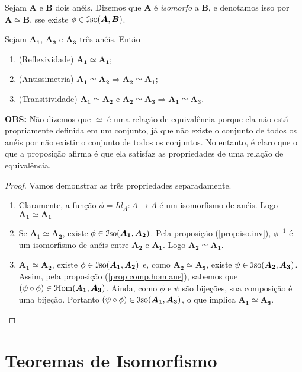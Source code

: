 \begin{defi}
	Sejam $\bm A$ e $\bm B$ dois anéis. Dizemos que $\bm A$ é \emph{isomorfo} a $\bm B$, e denotamos isso por $\bm A \simeq \bm B$, sse existe $\phi \in \mathcal{I}\mathrm{so}(\bm A,\bm B)$.
\end{defi}	

\begin{prop}
	Sejam $\bm{A_1}$, $\bm{A_2}$ e $\bm{A_3}$ três anéis. Então
	\begin{enumerate}
	\item (Reflexividade) $\bm{A_1} \simeq \bm{A_1}$;
	\item (Antissimetria) $\bm{A_1} \simeq \bm{A_2} \Rightarrow \bm{A_2} \simeq \bm{A_1}$;
	\item (Transitividade) $\bm{A_1} \simeq \bm{A_2} \text{\ e\ } \bm{A_2} \simeq \bm{A_3} \Rightarrow \bm{A_1} \simeq \bm{A_3}$.
	\end{enumerate}
\textbf{OBS:} Não dizemos que $\simeq$ é uma relação de equivalência porque ela não está propriamente definida em um conjunto, já que não existe o conjunto de todos os anéis por não existir o conjunto de todos os conjuntos. No entanto, é claro que o que a proposição afirma é que ela satisfaz as propriedades de uma relação de equivalência.
\end{prop}
\begin{proof}
	Vamos demonstrar as três propriedades separadamente.
	\begin{enumerate}
	\item Claramente, a função $\phi=Id_A: A \to A$ é um isomorfismo de anéis. Logo $\bm{A_1} \simeq \bm{A_1}$
	\item Se $\textbf{A}_1 \simeq \bm{A_2}$, existe $\phi \in \mathcal{I}\mathrm{so}(\bm{A_1},\bm{A_2})$. Pela proposição (\ref{prop:iso.inv}), $\phi^{-1}$ é um isomorfismo de anéis entre $\bm{A_2}$ e $\bm{A_1}$. Logo $\bm{A_2} \simeq \bm{A_1}$.
	\item $\bm{A_1} \simeq \bm{A_2}$, existe $\phi \in \mathcal{I}\mathrm{so}(\bm{A_1},\bm{A_2})$ e, como $\bm{A_2} \simeq \bm{A_3}$, existe $\psi \in \mathcal{I}\mathrm{so}(\bm{A_2},\bm{A_3})$. Assim, pela proposição (\ref{prop:comp.hom.ane}), sabemos que $(\psi \circ \phi) \in \mathcal{H}\mathrm{om}(\bm{A_1},\bm{A_3})$. Ainda, como $\phi$ e $\psi$ são bijeções, sua composição é uma bijeção. Portanto $(\psi \circ \phi) \in \mathcal{I}\mathrm{so}(\bm{A_1},\bm{A_3})$, o que implica $\bm{A_1} \simeq \bm{A_3}$.
	\end{enumerate}
\end{proof}

\section{Teoremas de Isomorfismo}


